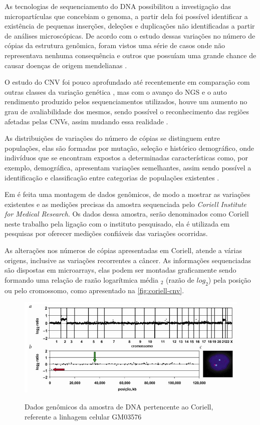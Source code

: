 As tecnologias de sequenciamento do DNA possibilitou a investigação das micropartículas que concebiam o genoma, a partir dela foi possível identificar a existência de pequenas inserções, deleções e duplicações não identificadas a partir de análises microscópicas. De acordo com o estudo dessas variações no número de cópias da estrutura genômica, foram vistos uma série de casos onde não representava nenhuma consequência e outros que possuíam uma grande chance de causar doenças de origem mendelianas \cite{Feuk2006,Xi2011}.

O estudo do CNV foi pouco aprofundado até recentemente em comparação com outras classes da variação genética \cite{Redon2006}, mas com o avanço do NGS e o auto rendimento produzido pelos sequenciamentos utilizados, houve um aumento no grau de avaliabilidade dos mesmos, sendo possível o reconhecimento das regiões afetadas pelas CNVs, assim mudando essa realidade \cite{Mills2011,Feuk2006}.

As distribuições de variações do número de cópias se distinguem entre populações, elas são formadas por mutação, seleção e histórico demográfico, onde indivíduos que se encontram expostos a determinadas características como, por exemplo, demográfica, apresentam variações semelhantes, assim sendo possível a identificação e classificação entre categorias de populações existentes \cite{Redon2006}.

Em \cite{Snijders2001} é feita uma montagem de dados genômicos, de modo a mostrar as variações existentes e as medições precisas da amostra sequenciada pelo \textit{Coriell Institute for Medical Research}. Os dados dessa amostra, serão denominados como Coriell neste trabalho pela ligação com o instituto pesquisado, ela é utilizada em pesquisas por oferecer medições confiáveis das variações ocorridas.

As alterações nos números de cópias apresentadas em Coriell, atende a várias origens, inclusive as variações recorrentes a câncer. As informações sequenciadas são dispostas em microarrays, elas podem ser montadas graficamente sendo formando uma relação de razão logarítmica média $_2$ (razão de $log_{2}$) pela posição ou pelo cromossomo, como apresentado na \autoref{fig:coriell-cnv}.

\begin{figure}[!htb]
    \centering
    \caption{Dados genômicos da amostra de DNA pertencente ao Coriell, referente a linhagem celular GM03576}
    \includegraphics[width=1\textwidth]{./dados/figuras/coriell-cnv}
    \label{fig:coriell-cnv}
\end{figure}

